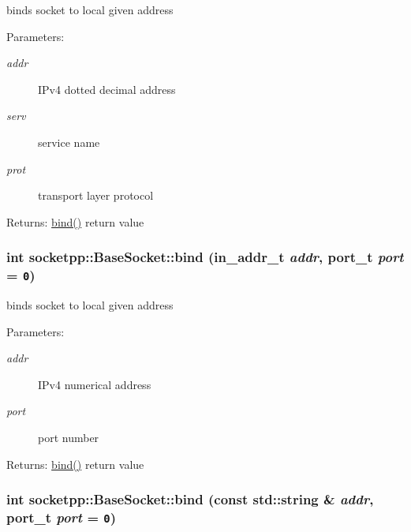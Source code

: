 \begin{CompactItemize}
binds socket to local given address 

\begin{Desc}
\item[Parameters:]
\begin{description}
\item[{\em addr}]IPv4 dotted decimal address \item[{\em serv}]service name \item[{\em prot}]transport layer protocol \end{description}
\end{Desc}
\begin{Desc}
\item[Returns:]\hyperlink{classsocketpp_1_1BaseSocket_78c2a8e6a5c7dfbc708c9cd637e88e51}{bind()} return value \end{Desc}
\hypertarget{classsocketpp_1_1BaseSocket_d3df73f534900d40f9dff26171ec93b5}{
\subsubsection[{bind}]{\setlength{\rightskip}{0pt plus 5cm}int socketpp::BaseSocket::bind (in\_\-addr\_\-t {\em addr}, \/  {\bf port\_\-t} {\em port} = {\tt 0})}}
\label{classsocketpp_1_1BaseSocket_d3df73f534900d40f9dff26171ec93b5}


binds socket to local given address 

\begin{Desc}
\item[Parameters:]
\begin{description}
\item[{\em addr}]IPv4 numerical address \item[{\em port}]port number \end{description}
\end{Desc}
\begin{Desc}
\item[Returns:]\hyperlink{classsocketpp_1_1BaseSocket_78c2a8e6a5c7dfbc708c9cd637e88e51}{bind()} return value \end{Desc}
\hypertarget{classsocketpp_1_1BaseSocket_78c2a8e6a5c7dfbc708c9cd637e88e51}{
\subsubsection[{bind}]{\setlength{\rightskip}{0pt plus 5cm}int socketpp::BaseSocket::bind (const std::string \& {\em addr}, \/  {\bf port\_\-t} {\em port} = {\tt 0})}}
\label{classsocketpp_1_1BaseSocket_78c2a8e6a5c7dfbc708c9cd637e88e51}



\end{CompactItemize}
